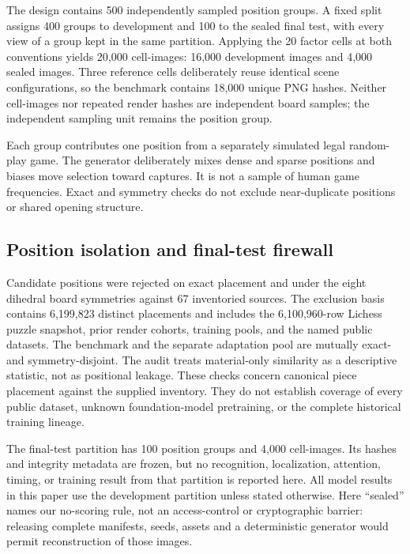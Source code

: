 

The design contains 500 independently sampled position groups. A fixed split
assigns 400 groups to development and 100 to the sealed final test, with every
view of a group kept in the same partition. Applying the 20 factor cells at
both conventions yields 20,000 cell-images: 16,000 development images and
4,000 sealed images. Three reference cells deliberately reuse identical scene
configurations, so the benchmark contains 18,000 unique PNG hashes. Neither
cell-images nor repeated render hashes are independent board samples; the
independent sampling unit remains the position group.

Each group contributes one position from a separately simulated legal random-play
game. The generator deliberately mixes dense and sparse positions and biases move
selection toward captures. It is not a sample of human game frequencies. Exact
and symmetry checks do not exclude near-duplicate positions or shared opening
structure.

\subsection{Position isolation and final-test firewall}

Candidate positions were rejected on exact placement and under the eight
dihedral board symmetries against 67 inventoried sources. The exclusion basis
contains 6,199,823 distinct placements and includes the 6,100,960-row Lichess
puzzle snapshot, prior render cohorts, training pools, and the named public
datasets. The benchmark and the separate adaptation pool are mutually
exact- and symmetry-disjoint. The audit treats material-only similarity as a
descriptive statistic, not as positional leakage. These checks concern canonical
piece placement against the supplied inventory. They do not establish coverage
of every public dataset, unknown foundation-model pretraining, or the complete
historical training lineage.

The final-test partition has 100 position groups and 4,000 cell-images. Its
hashes and integrity metadata are frozen, but no recognition, localization,
attention, timing, or training result from that partition is reported here.
All model results in this paper use the development partition unless stated
otherwise. Here ``sealed'' names our no-scoring rule, not an access-control
or cryptographic barrier: releasing complete manifests, seeds, assets and a
deterministic generator would permit reconstruction of those images.

